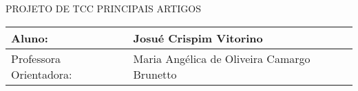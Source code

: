 

\begin{center}
PROJETO DE TCC PRINCIPAIS ARTIGOS


\begin{tabular}{l|l}

\hline
Aluno: & Josué Crispim Vitorino \\ 
\hline
Professora Orientadora: & Maria Ang\'elica de Oliveira Camargo Brunetto \\ 
\hline
\end{tabular}\\


\end{center}

